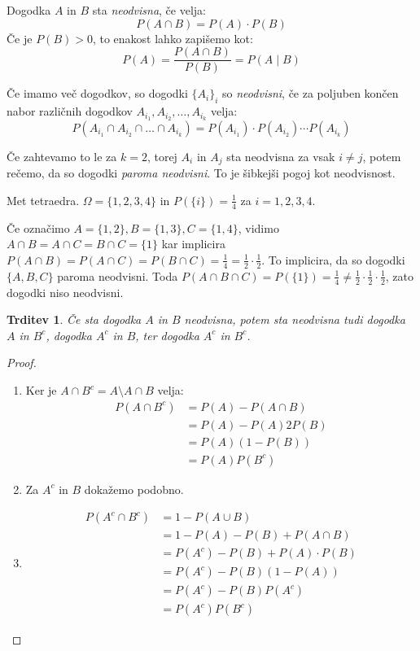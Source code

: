 \documentclass[12pt]{book}
\def\n{\noindent}
\theoremstyle{definition}
\theoremstyle{plain}
\theoremstyle{plain}
\newtheorem{trditev}{Trditev}
\theoremstyle{plain}
\theoremstyle{remark}
\begin{document}
\n Dogodka $A$ in $B$ sta \emph{neodvisna}, če velja: 
$$
P(A \cap B)=P(A) \cdot P(B)
$$
Če je $P(B)>0$, to enakost lahko zapišemo kot: 
$$
P(A)=\frac{P\left(A \cap B\right)}{P(B)}=P(A \mid B)
$$

\n Če imamo več dogodkov, so dogodki $\{ A_i \}_i$ so \emph{neodvisni}, če za poljuben končen nabor različnih dogodkov $A_{i_1}, A_{i_2}, \ldots, A_{i_k}$ velja: 
$$
P\left(A_{i_1} \cap A_{i_2} \cap \ldots \cap A_{i_k}\right)=P\left(A_{i_1}\right) \cdot P\left(A_{i_2}\right) \cdots P\left(A_{i_k}\right)
$$

Če zahtevamo to le za $k=2$, torej $A_i$ in $A_j$ sta neodvisna za vsak $i \neq j$, potem rečemo, da so dogodki \emph{paroma neodvisni}. To je šibkejši pogoj kot neodvisnost. 

\begin{zgled}
    Met tetraedra. $\Omega=\{1,2,3,4\}$ in $P(\{i\})=\frac{1}{4}$ za $i = 1, 2, 3, 4$. 

    Če označimo $A=\{1,2\}, B=\{1,3\}, C=\{1,4\}$, vidimo $A \cap B=A \cap C=B \cap C=\{1\}$ kar implicira $P(A \cap B)=P(A \cap C)=P(B \cap C)=\frac{1}{4}=\frac{1}{2} \cdot \frac{1}{2}$. To implicira, da so dogodki $\{A, B, C\}$ paroma neodvisni. Toda $P(A \cap B \cap C)=P(\{1\})=\frac{1}{4} \neq \frac{1}{2} \cdot \frac{1}{2} \cdot \frac{1}{2}$, zato dogodki niso neodvisni. 
\end{zgled}

\begin{trditev}
    Če sta dogodka $A$ in $B$ neodvisna, potem sta neodvisna tudi dogodka $A$ in $B^c$, dogodka $A^c$ in $B$, ter dogodka $A^c$ in $B^c$.
\end{trditev}

\begin{proof}
    \begin{enumerate}[label=(\roman*)]
        \item Ker je $A \cap B^c = A \setminus A \cap B$ velja: 
        $$
        \begin{aligned}
            P\left(A \cap B^c\right)&=P(A)-P(A \cap B) \\
            &=P(A)-P(A)2 P(B) \\
            &=P(A) (1-P(B)) \\
            &=P(A) P\left(B^c\right)
        \end{aligned}
        $$
        \item Za $A^c$ in $B$ dokažemo podobno.
        \item 
        $$
        \begin{aligned}
            P\left(A^c \cap B^c\right)&=1-P(A \cup B) \\
            &= 1-P(A)-P(B)+P(A \cap B) \\
            &= P\left(A^c\right)-P(B)+P(A) \cdot P(B) \\
            &= P\left(A^c\right)-P(B)(1-P(A)) \\
            &= P\left(A^c\right)-P(B) P\left(A^c\right) \\
            &= P\left(A^c\right) P\left(B^c\right)
        \end{aligned}
        $$
    \end{enumerate} 
\end{proof}
\end{document}
